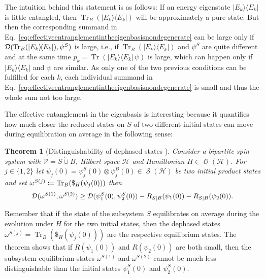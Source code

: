 \documentclass[a4paper,12pt,listof=totoc,index=totoc,bibliography=totoc,headsepline=false,headings=normal,BCOR16.153846mm,DIV12,headinclude,twoside,cleardoublepage=empty,numbers=noenddot,final]{scrreprt}
\theoremstyle{mystyle}
\numberwithin{equation}{section}
\numberwithin{figure}{section}
\numberwithin{lemma}{section}
\newtheorem{theorem}{Theorem}
\numberwithin{theorem}{section}
\numberwithin{corollary}{section}
\numberwithin{definition}{section}
\numberwithin{conjecture}{section}
\numberwithin{observation}{section}
\newcommand{\+}{\mkern2mu}
\newcommand{\coloneqq}{\mathrel{\vcentcolon\mkern-1.2mu=}} %
\newcommand{\dunion}{\mathbin{\dot{\cup}}}
\newcommand{\texteqref}[1]{Eq.~\eqref{#1}}
\renewcommand{\H}{H}
\newcommand{\Vset}{\mathcal{V}}
\newcommand{\bra}[1]{\langle #1|}
\newcommand{\ket}[1]{|#1\rangle}
\newcommand{\ketbra}[2]{\ket{#1}\!\bra{#2}}
\newcommand{\tracedistance}[3][]{
  \ifthenelse{\equal{#2}{}}
  {\ifthenelse{\equal{#3}{}}
    {\mathcal{D}_{#1}}{}
  }{
    \ifthenelse{\equal{#1}{}}
    {\operatorname{\mathcal{D}}(#2,#3)}
    {\operatorname{\mathcal{D}}_{#1}(#2,#3)}
  }
}
\DeclareMathOperator{\1}{\mathds{1}}
\DeclareMathOperator{\Obs}{\mathcal{O}}
\DeclareMathOperator{\Qst}{\mathcal{S}}
\DeclareMathOperator{\Tr}{Tr}
\newcommand{\mc}[1]{\mathcal{#1}}
\newcommand{\mcH}{\mc{H}}
\begin{document}
The intuition behind this statement is as follows:
If an energy eigenstate $\ketbra{E_k}{E_k}$ is little entangled, then $\Tr_B(\ketbra{E_k}{E_k})$ will be approximately a pure state.
But then the corresponding summand in \texteqref{eq:effectiveentranglementintheeigenbasisnondegenerate} can be large only if $\tracedistance{\Tr_B(\ketbra{E_k}{E_k})}{\psi^S}$ is large, i.e., if $\Tr_B(\ketbra{E_k}{E_k})$ and $\psi^S$ are quite different and at the same time $p_k = \Tr(\ketbra{E_k}{E_k}\,\psi)$ is large, which can happen only if $\ketbra{E_k}{E_k}$ and $\psi$ are similar.
As only one of the two previous conditions can be fulfilled for each $k$, each individual summand in \texteqref{eq:effectiveentranglementintheeigenbasisnondegenerate} is small and thus the whole sum not too large.

The effective entanglement in the eigenbasis is interesting because it quantifies how much closer the reduced states on $S$ of two different initial states can move during equilibration on average in the following sense:
\begin{theorem}[Distinguishability of dephased states {\cite[Theorem~1]{PhysRevLett.10-6}}] \label{thm:absenceofthermalizaton}
  Consider a bipartite spin system with $\Vset = S \dunion B$, Hilbert space $\mcH$ and Hamiltonian $\H \in \Obs(\mcH)$.
  For $j \in \{1,2\}$ let $\psi_j(0) = \psi^S_j(0) \otimes \psi^B_j(0) \in \Qst(\mcH)$ be two initial product states and set $\omega^{S(j)} \coloneqq \Tr_B(\$_\H(\psi_j(0)))$ then
  \begin{equation}
    \tracedistance{\omega^{S(1)}}{\omega^{S(2)}} \geq \tracedistance{\psi^S_1(0)}{\psi^S_2(0)} - R_{S|B}(\psi_1(0)) - R_{S|B}(\psi_2(0)) .      
  \end{equation}
\end{theorem}
Remember that if the state of the subsystem $S$ equilibrates on average during the evolution under $\H$ for the two initial states, then the dephased states $\omega^{S(j)} = \Tr_B(\$_\H(\psi_{j}(0)))$ are the respective equilibrium states.
The theorem shows that if $R(\psi_1(0))$ and $R(\psi_2(0))$ are both small, then the subsystem equilibrium states $\omega^{S(1)}$ and $\omega^{S(2)}$ cannot be much less distinguishable than the initial states $\psi^S_1(0)$ and $\psi^S_2(0)$.
\end{document}
